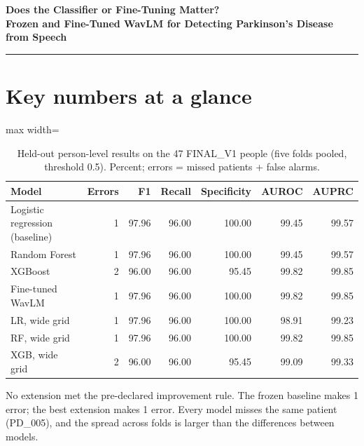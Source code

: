 \documentclass[11pt,a4paper]{article}
\begin{document}
\begin{center}{\LARGE\bfseries Does the Classifier or Fine-Tuning Matter?\\[3pt]\Large Frozen and Fine-Tuned WavLM for Detecting Parkinson's Disease from Speech\par}\vspace{8pt}{\large Baseline-and-extensions study on the FINAL\_V1 folds (CSE 431, topic 4a)\par}\vspace{6pt}{\small Evidence: frozen protocol FINAL\_V1 (47 people, 785 recordings, five speaker-disjoint folds); amendments A2 and A3, declared before their runs.\par}\end{center}
\vspace{4pt}\hrule\vspace{6pt}
\tableofcontents
\newpage
\section*{Key numbers at a glance}
\begin{table}[H]\centering\footnotesize\renewcommand{\arraystretch}{1.15}
\caption{Held-out person-level results on the 47 FINAL\_V1 people (five folds pooled, threshold 0.5). Percent; errors = missed patients + false alarms.}
\begin{adjustbox}{max width=\linewidth}\begin{tabular}{lrrrrrr}
\toprule
\textbf{Model} & \textbf{Errors} & \textbf{F1} & \textbf{Recall} & \textbf{Specificity} & \textbf{AUROC} & \textbf{AUPRC}\\
\midrule
Logistic regression (baseline) & 1 & 97.96 & 96.00 & 100.00 & 99.45 & 99.57\\
Random Forest & 1 & 97.96 & 96.00 & 100.00 & 99.45 & 99.57\\
XGBoost & 2 & 96.00 & 96.00 & 95.45 & 99.82 & 99.85\\
Fine-tuned WavLM & 1 & 97.96 & 96.00 & 100.00 & 99.82 & 99.85\\
LR, wide grid & 1 & 97.96 & 96.00 & 100.00 & 98.91 & 99.23\\
RF, wide grid & 1 & 97.96 & 96.00 & 100.00 & 99.82 & 99.85\\
XGB, wide grid & 2 & 96.00 & 96.00 & 95.45 & 99.09 & 99.33\\
\bottomrule
\end{tabular}\end{adjustbox}\end{table}
\begin{tcolorbox}[colback=orange!5,colframe=orange!70!black,boxrule=0.5pt,arc=2pt,left=5pt,right=5pt,top=3pt,bottom=3pt,title={\small\bfseries Key finding}]\small No extension met the pre-declared improvement rule. The frozen baseline makes 1 error; the best extension makes 1 error. Every model misses the same patient (PD\_005), and the spread across folds is larger than the differences between models.\end{tcolorbox}
\end{document}
